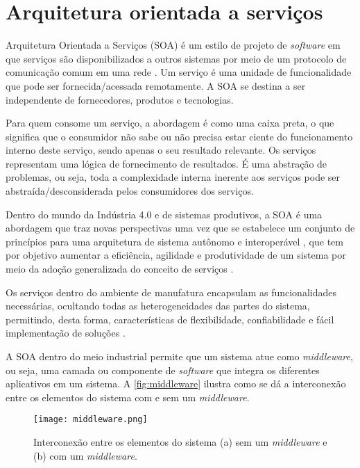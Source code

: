 \section{Arquitetura orientada a serviços}
\label{sec:webservices}
	
	Arquitetura Orientada a Serviços (SOA) é um estilo de projeto de \textit{software} em que serviços são disponibilizados a outros sistemas por meio de um protocolo de comunicação comum em uma rede \cite{bell2008soa}. Um serviço é uma unidade de funcionalidade que pode ser fornecida/acessada remotamente. A SOA se destina a ser independente de fornecedores, produtos e tecnologias.
	
	Para quem consome um serviço, a abordagem é como uma caixa preta, o que significa que o consumidor não sabe ou não precisa estar ciente do funcionamento interno deste serviço, sendo apenas o seu resultado relevante. Os serviços representam uma lógica de fornecimento de resultados. É uma abstração de problemas, ou seja, toda a complexidade interna inerente aos serviços pode ser abstraída/desconsiderada pelos consumidores dos serviços.
	
	Dentro do mundo da Indústria 4.0 e de sistemas produtivos, a SOA é uma abordagem que traz novas perspectivas uma vez que se estabelece um conjunto de princípios para uma arquitetura de sistema autônomo e interoperável \cite{candido2009soa}, que tem por objetivo aumentar a eficiência, agilidade e produtividade de um sistema por meio da adoção generalizada do conceito de serviços \cite{souit2013soa}.
	
	Os serviços dentro do ambiente de manufatura encapsulam as funcionalidades necessárias, ocultando todas as heterogeneidades das partes do sistema, permitindo, desta forma, características de flexibilidade, confiabilidade e fácil implementação de	soluções \cite{groba2008soa}.
	
	A SOA dentro do meio industrial permite que um sistema atue como \textit{middleware}, ou seja, uma camada ou componente de \textit{software} que integra os diferentes aplicativos em um sistema. A \autoref{fig:middleware} ilustra como se dá a interconexão entre os elementos do sistema com e sem um \textit{middleware}.
	
	\begin{figure}[htb]
		\centering
		\caption{Interconexão entre os elementos do sistema (a) sem um \textit{middleware} e (b) com um \textit{middleware}.}
		\label{fig:middleware}
		\texttt{[image: middleware.png]}
	\end{figure}

